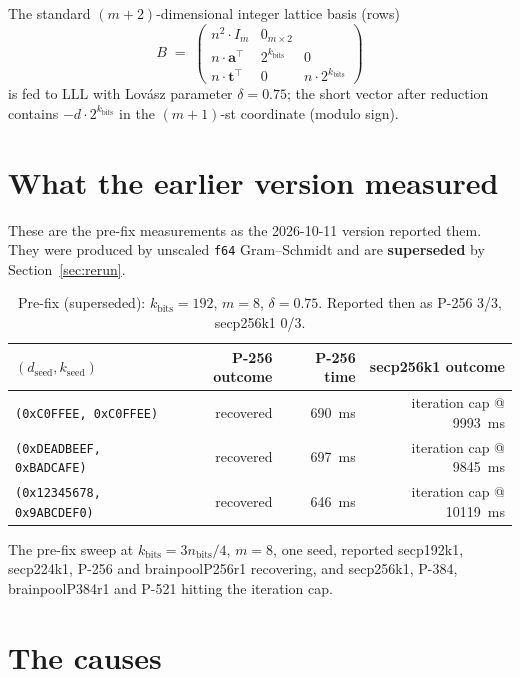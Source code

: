 \documentclass[10pt,a4paper]{article}
\begin{document}
The standard $(m+2)$-dimensional integer lattice basis (rows)
\[
   B \;=\;
   \begin{pmatrix}
     n^2 \cdot I_m   & 0_{m \times 2}  \\[2pt]
     n \cdot \mathbf{a}^\top  & 2^{k_{\text{bits}}}  & 0 \\[2pt]
     n \cdot \mathbf{t}^\top  & 0  & n \cdot 2^{k_{\text{bits}}}
   \end{pmatrix}
\]
is fed to LLL with Lov\'asz parameter $\delta = 0.75$; the short
vector after reduction contains $-d \cdot 2^{k_{\text{bits}}}$ in
the $(m+1)$-st coordinate (modulo sign).

\section{What the earlier version measured}
\label{sec:prefix}

These are the pre-fix measurements as the 2026-10-11 version reported
them. They were produced by unscaled \texttt{f64} Gram--Schmidt and
are \textbf{superseded} by Section~\ref{sec:rerun}.

\begin{table}[h]
\centering
\begin{tabular}{lrrr}
\toprule
$(d_{\text{seed}}, k_{\text{seed}})$ & P-256 outcome & P-256 time & secp256k1 outcome \\
\midrule
\texttt{(0xC0FFEE, 0xC0FFEE)}           & recovered & 690~ms  & iteration cap @ 9993~ms \\
\texttt{(0xDEADBEEF, 0xBADCAFE)}        & recovered & 697~ms  & iteration cap @ 9845~ms \\
\texttt{(0x12345678, 0x9ABCDEF0)}       & recovered & 646~ms  & iteration cap @ 10119~ms \\
\bottomrule
\end{tabular}
\caption{Pre-fix (superseded): $k_{\text{bits}} = 192$, $m = 8$,
$\delta = 0.75$. Reported then as P-256 3/3, secp256k1 0/3.}
\label{tab:prefix}
\end{table}

The pre-fix sweep at $k_{\text{bits}} = 3 n_{\text{bits}}/4$, $m = 8$,
one seed, reported secp192k1, secp224k1, P-256 and brainpoolP256r1
recovering, and secp256k1, P-384, brainpoolP384r1 and P-521 hitting
the iteration cap.

\section{The causes}
\end{document}
